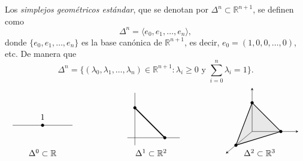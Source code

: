 \begin{definicion}
Los \textit{simplejos geométricos estándar}, que se denotan por $\Delta^n \subset \mathbb{R}^{n+1}$, se definen como
\[
\Delta^n = \langle e_0, e_1, \dots, e_n \rangle,
\]
donde $\{e_0, e_1, \dots, e_n\}$ es la base canónica de $\mathbb{R}^{n+1}$, es decir, $e_0 = (1, 0, 0, \dots, 0)$, etc. De manera que
\[
\Delta^n = \Big\{ (\lambda_0, \lambda_1, \dots, \lambda_n) \in \mathbb{R}^{n+1} : \lambda_i \geq 0 \text{ y } \sum_{i=0}^n \lambda_i = 1 \Big\}.
\]
\[
\begin{tikzpicture}[scale=1.05, >=stealth]
    \begin{scope}[shift={(0, 0)}]
        \draw[thin] (-1.2, 0.5) -- (1.2, 0.5);
        \filldraw (0, 0.5) circle (1.6pt) node[above=3pt] {$1$};
        \node at (0, -0.6) {$\Delta^0 \subset \mathbb{R}$};
    \end{scope}

    \begin{scope}[shift={(3.7, 0)}]
        \draw[thin] (-0.3, 0) -- (1.8, 0);
        \draw[thin] (0, -0.3) -- (0, 1.8);
        \draw[very thick] (0, 1.2) -- (1.2, 0);
        \filldraw (0, 1.2) circle (1.6pt);
        \filldraw (1.2, 0) circle (1.6pt);
        \node at (0.65, -0.6) {$\Delta^1 \subset \mathbb{R}^2$};
    \end{scope}

    \begin{scope}[shift={(8.4, 0.25)}]
        \coordinate (O) at (0, 0);
        \coordinate (E0) at (-0.65, -0.55);
        \coordinate (E1) at (1.15, 0);
        \coordinate (E2) at (0, 1.15);

        \fill[gray!18] (E0) -- (E1) -- (E2) -- cycle;

        \draw[->, thin] (O) -- (-1.05, -0.88);
        \draw[->, thin] (O) -- (1.85, 0);
        \draw[->, thin] (O) -- (0, 1.75);

        \draw[thick] (E0) -- (E1) -- (E2) -- cycle;
        \filldraw (E0) circle (1.6pt);
        \filldraw (E1) circle (1.6pt);
        \filldraw (E2) circle (1.6pt);

        \node at (0.3, -0.85) {$\Delta^2 \subset \mathbb{R}^3$};
    \end{scope}
\end{tikzpicture}
\]
\end{definicion}
